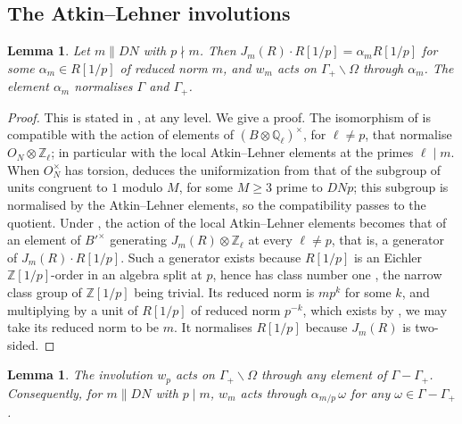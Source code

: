 \documentclass[11pt]{amsart}
\theoremstyle{plain}
\newtheorem{lemma}[theorem]{Lemma}
\theoremstyle{remark}
\newcommand{\Q}{\mathbb{Q}}
\newcommand{\Z}{\mathbb{Z}}
\begin{document}
\subsection{The Atkin--Lehner involutions}

\begin{lemma}\label{lem:wm}
Let $m \parallel DN$ with $p \nmid m$. Then $J_m(R) \cdot R[1/p] = \alpha_m R[1/p]$ for some $\alpha_m \in R[1/p]$ of reduced norm $m$, and $w_m$ acts on $\Gamma_+\backslash\Omega$ through $\alpha_m$. The element $\alpha_m$ normalises $\Gamma$ and $\Gamma_+$.
\end{lemma}

\begin{proof}
This is stated in \cite[p.~202]{Ogg}, at any level. We give a proof. The isomorphism of \cite[III, Theorem~(5.2)]{BC} is compatible with the action of elements of $(B \otimes \Q_\ell)^\times$, for $\ell \neq p$, that normalise $O_N \otimes \Z_\ell$; in particular with the local Atkin--Lehner elements at the primes $\ell \mid m$. When $O_N^\times$ has torsion, \cite[III, 5.3.2]{BC} deduces the uniformization from that of the subgroup of units congruent to $1$ modulo $M$, for some $M \ge 3$ prime to $DNp$; this subgroup is normalised by the Atkin--Lehner elements, so the compatibility passes to the quotient. Under \cite[III, 5.3.3]{BC}, the action of the local Atkin--Lehner elements becomes that of an element of $B'^\times$ generating $J_m(R) \otimes \Z_\ell$ at every $\ell \neq p$, that is, a generator of $J_m(R) \cdot R[1/p]$. Such a generator exists because $R[1/p]$ is an Eichler $\Z[1/p]$-order in an algebra split at $p$, hence has class number one \cite[Theorem~28.5.5]{Voi}, the narrow class group of $\Z[1/p]$ being trivial. Its reduced norm is $m p^k$ for some $k$, and multiplying by a unit of $R[1/p]$ of reduced norm $p^{-k}$, which exists by \cite[Corollary~28.6.4]{Voi}, we may take its reduced norm to be $m$. It normalises $R[1/p]$ because $J_m(R)$ is two-sided.
\end{proof}

\begin{lemma}\label{lem:wp}
The involution $w_p$ acts on $\Gamma_+\backslash\Omega$ through any element of $\Gamma - \Gamma_+$. Consequently, for $m \parallel DN$ with $p \mid m$, $w_m$ acts through $\alpha_{m/p}\,\omega$ for any $\omega \in \Gamma - \Gamma_+$.
\end{lemma}
\end{document}
